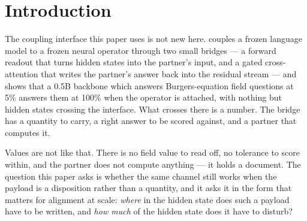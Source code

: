 \documentclass[11pt]{article}
\newcommand{\companion}{\citet{furui2026psilm}}
\begin{document}
\begin{abstract}
other prompts' --- reproduces the withholding ($21{:}3$), while a set made from no prompt carries a weaker copy ($13{:}5$, $p = 0.096$), and a bridge trained with no partner at all withholds on 14 pairs against 2, in each of two runs, where two runs with the partner give 21 and 16; whether the partner adds that difference is not settled by two runs a recipe. Under further criteria fixed in advance that stored set stands in for the partner's path at 9B, leaving three benchmarks where the partner's path has them (GSM8K 86, MMLU 75 and BoolQ 90 of 100, against 84, 75 and 89); at 0.5B, where the write uses what it reads, that bridge's own stored set does not (teacher-forced it moves the output by a KL of 0.026 where the limit is 0.005, and 13 of 100 keyword decisions differ). Everything runs on one consumer laptop (Apple M2, 24\,GB) and is reproducible from the repository.
\end{abstract}

\section{Introduction}
\label{sec:intro2}

The coupling interface this paper uses is not new here. \companion{} couples a frozen language model to a frozen neural operator through two small bridges --- a forward readout that turns hidden states into the partner's input, and a gated cross-attention that writes the partner's answer back into the residual stream --- and shows that a 0.5B backbone which answers Burgers-equation field questions at 5\% answers them at 100\% when the operator is attached, with nothing but hidden states crossing the interface. What crosses there is a number. The bridge has a quantity to carry, a right answer to be scored against, and a partner that computes it.

Values are not like that. There is no field value to read off, no tolerance to score within, and the partner does not compute anything --- it holds a document. The question this paper asks is whether the same channel still works when the payload is a disposition rather than a quantity, and it asks it in the form that matters for alignment at scale: \emph{where} in the hidden state does such a payload have to be written, and \emph{how much} of the hidden state does it have to disturb?
\end{document}

